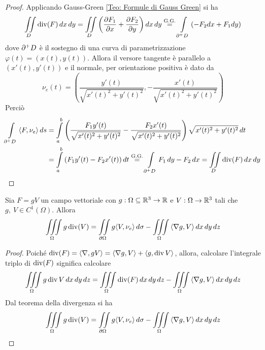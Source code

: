  \begin{proof}
     Applicando Gauss-Green \eqref{Teo: Formule di Gauss Green} si ha
     \begin{equation}
     \iint\limits_{D}{\operatorname{div}(F)}\,dx\,dy=\iint\limits_{D}{\left(\frac{\partial F_1}{\partial x}+ \frac{\partial F_2}{\partial y}\right)}\,dx\,dy \overset{\text{G.G.}}{=} \int\limits_{\partial^+ D}{(-F_2 dx + F_1 dy)}
     \end{equation}
     dove $\partial^+ D$ è il sostegno di una curva di parametrizzazione $\varphi(t)= (x(t), y(t))$. Allora il versore tangente è parallelo a $(x'(t), y'(t))$ e il normale, per orientazione positiva è dato da 
     \begin{equation}
         \nu_e(t)=\left(\frac{y'(t)}{\sqrt{x'(t)^2+y'(t)^2}}, -\frac{x'(t)}{\sqrt{x'(t)^2+y'(t)^2}} \right)
     \end{equation}
     Perciò
     \begin{equation}
         \begin{aligned}
             \int\limits_{\partial^+ D}{\langle F, \nu_e \rangle}\,ds &= \int\limits_{a}^{b}{\left(\frac{F_1y'(t)}{\sqrt{x'(t)^2+y'(t)^2}} -\frac{F_2x'(t)}{\sqrt{x'(t)^2+y'(t)^2}} \right)\sqrt{x'(t)^2+y'(t)^2}}\, dt\\
             &=\int\limits_{a}^{b}{(F_1 y'(t)- F_2 x'(t))}\, dt \overset{\text{G.G.}}{=} \int\limits_{\partial^+ D}{F_1\,dy- F_2\,dx} = \iint\limits_{D}{\operatorname{div}(F)}\,dx\,dy
         \end{aligned}
     \end{equation}
\end{proof}
\begin{corollary}
    Sia $F= gV$ un campo vettoriale con $g:\Omega \subseteq \mathbb{R}^3\to \mathbb{R}$ e $V: \Omega \to \mathbb{R}^3$ tali che $g,\ V \in C^1(\Omega)$. Allora 
    \begin{equation}
    \iiint\limits_{\Omega}{g \operatorname{div}(V)}= \iint\limits_{\partial \Omega}{g \langle V, \nu_e \rangle}\, d\sigma - \iiint\limits_{\Omega}{\langle \nabla g, V \rangle}\,dx\,dy\,dz
    \end{equation}
\end{corollary}
\begin{proof}
Poiché $\operatorname{div}(F)= \langle \nabla, gV \rangle = \langle \nabla g, V \rangle + \langle g, \operatorname{div} V \rangle$, allora, calcolare l'integrale triplo di $\operatorname{div}(F)$ significa calcolare
    \begin{equation}
      \iiint\limits_\Omega{g \operatorname{div}V}\,dx\,dy\,dz = \iiint\limits_{\Omega} {\operatorname{div}(F)}\,dx\,dy\,dz - \iiint\limits_{\Omega} {\langle \nabla g, V \rangle}\,dx\,dy\,dz
    \end{equation}
    Dal teorema della divergenza si ha 
    \begin{equation}
    \iiint\limits_{\Omega}{g \operatorname{div}(V)}= \iint\limits_{\partial \Omega}{g \langle V, \nu_e \rangle}\, d\sigma - \iiint\limits_{\Omega}{\langle \nabla g, V \rangle}\,dx\,dy\,dz
    \end{equation}
\end{proof}